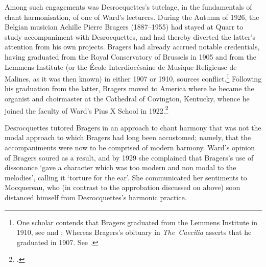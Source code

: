 Among such engagements was Desrocquettes's tutelage, in the fundamentals of chant harmonisation, of one of Ward's lecturers.
During the Autumn of 1926, the Belgian musician Achille Pierre Bragers (1887--1955) had stayed at Quarr to study accompaniment with Desrocquettes, and had thereby diverted the latter's attention from his own projects.
Bragers had already accrued notable credentials, having graduated from the Royal Conservatory of Brussels in 1905 and from the Lemmens Institute (or the École Interdiocésaine de Musique Religieuse de Malines, as it was then known) in either 1907 or 1910, sources conflict.\footnote{One scholar contends that Bragers graduated from the Lemmens Institute in 1910, see \cite[p.~19 n.~10]{BrancaleoneGoldenYearsAmerican2019} and \cite[p.~19 n.~35]{BrancaleoneGeorgiaStevensinstitutionalization2012}; Whereas Bragers's obituary in \emph{The~Caecilia} asserts that he graduated in 1907. See \cite[169]{AchilleBragers18871955}.}
Following his graduation from the latter, Bragers moved to America where he became the organist and choirmaster at the Cathedral of Covington, Kentucky, whence he joined the faculty of Ward's Pius X School in 1922.\footcite[169]{AchilleBragers18871955}

Desrocquettes tutored Bragers in an approach to chant harmony that was not the modal approach to which Bragers had long been accustomed; namely, that the accompaniments were now to be comprised of modern harmony.
Ward's opinion of Bragers soured as a result, and by 1929 she complained that Bragers's use of dissonance `gave a character which was too modern and non modal to the melodies', calling it `torture for the ear'.
She communicated her sentiments to Mocquereau, who (in contrast to the approbation discussed on  above) soon distanced himself from Desrocquettes's harmonic practice.

